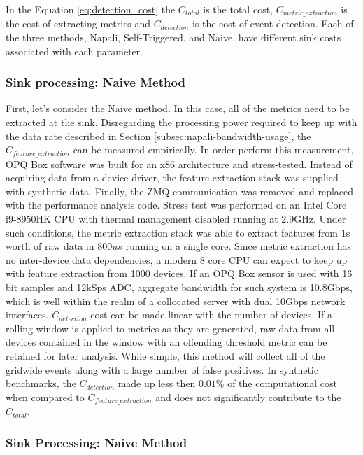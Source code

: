 In the Equation \ref{eq:detection_cost} the $C_{total}$ is the total cost, $C_{metric\_extraction}$ is the cost of extracting metrics and $C_{detection}$ is the cost of event detection.\cite{de2015effective}
Each of the three methods, Napali, Self-Triggered, and Naive, have different sink costs associated with each parameter.


\subsubsection{Sink processing: Naive Method}

First, let's consider the Naive method.
In this case, all of the metrics need to be extracted at the sink.
Disregarding the processing power required to keep up with the data rate described in Section \ref{subsec:napali-bandwidth-usage}, the $C_{feature\_extraction}$ can be measured empirically.
In order perform this measurement, OPQ Box software was built for an x86 architecture and stress-tested.
Instead of acquiring data from a device driver, the feature extraction stack was supplied with synthetic data.
Finally, the ZMQ communication was removed and replaced with the performance analysis code.
Stress test was performed on an Intel Core i9-8950HK CPU with thermal management disabled running at 2.9GHz.
Under such conditions, the metric extraction stack was able to extract features from 1s worth of raw data in $800us$ running on a single core.
Since metric extraction has no inter-device data dependencies, a modern 8 core CPU can expect to keep up with feature extraction from 1000 devices.
If an OPQ Box sensor is used with 16 bit samples and 12kSps ADC, aggregate bandwidth for such system is 10.8Gbps, which is well within the realm of a collocated server with dual 10Gbps network interfaces.
$C_{detection}$ cost can be made linear with the number of devices.
If a rolling window is applied to metrics as they are generated, raw data from all devices contained in the window with an offending threshold metric can be retained for later analysis.
While simple, this method will collect all of the gridwide events along with a large number of false positives.
In synthetic benchmarks, the $C_{detection}$ made up less then $0.01\%$ of the computational cost when compared to $C_{feature\_extraction}$
and does not significantly contribute to the $C_{total}$.

\subsubsection{Sink Processing: Naive Method}

